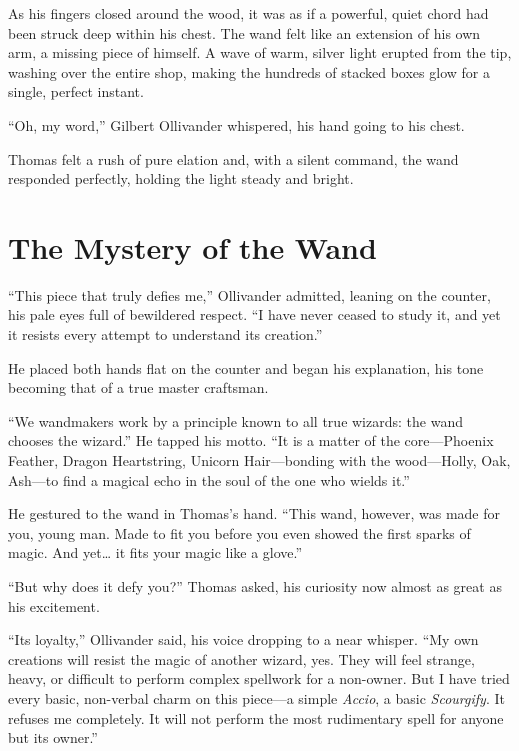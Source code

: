 As his fingers closed around the wood, it was as if a powerful, quiet chord had been struck deep within his chest. The wand felt like an extension of his own arm, a missing piece of himself. A wave of warm, silver light erupted from the tip, washing over the entire shop, making the hundreds of stacked boxes glow for a single, perfect instant.

\enquote{Oh, my word,} Gilbert Ollivander whispered, his hand going to his chest.

Thomas felt a rush of pure elation and, with a silent command, the wand responded perfectly, holding the light steady and bright.

\section*{The Mystery of the Wand}

\enquote{This piece that truly defies me,} Ollivander admitted, leaning on the counter, his pale eyes full of bewildered respect. \enquote{I have never ceased to study it, and yet it resists every attempt to understand its creation.}

He placed both hands flat on the counter and began his explanation, his tone becoming that of a true master craftsman.

\enquote{We wandmakers work by a principle known to all true wizards: the wand chooses the wizard.} He tapped his motto. \enquote{It is a matter of the core---Phoenix Feather, Dragon Heartstring, Unicorn Hair---bonding with the wood---Holly, Oak, Ash---to find a magical echo in the soul of the one who wields it.}

He gestured to the wand in Thomas's hand. \enquote{This wand, however, was made for you, young man. Made to fit you before you even showed the first sparks of magic. And yet\ldots{} it fits your magic like a glove.}

\enquote{But why does it defy you?} Thomas asked, his curiosity now almost as great as his excitement.

\enquote{Its loyalty,} Ollivander said, his voice dropping to a near whisper. \enquote{My own creations will resist the magic of another wizard, yes. They will feel strange, heavy, or difficult to perform complex spellwork for a non-owner. But I have tried every basic, non-verbal charm on this piece---a simple \textit{Accio}, a basic \textit{Scourgify}. It refuses me completely. It will not perform the most rudimentary spell for anyone but its owner.}

